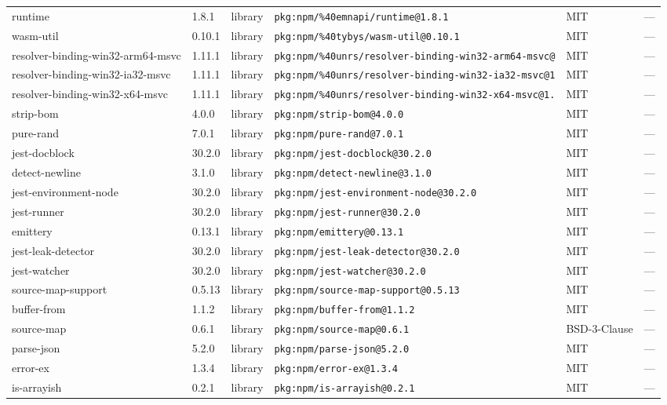 \documentclass[11pt]{article}
\begin{document}
\begin{longtable}{|l|l|l|p{2.2cm}|l|p{4cm}|}
runtime & 1.8.1 & library & \texttt{pkg:npm/\%40emnapi/runtime@1.8.1} & MIT & — \\
wasm-util & 0.10.1 & library & \texttt{pkg:npm/\%40tybys/wasm-util@0.10.1} & MIT & — \\
resolver-binding-win32-arm64-msvc & 1.11.1 & library & \texttt{pkg:npm/\%40unrs/resolver-binding-win32-arm64-msvc@} & MIT & — \\
resolver-binding-win32-ia32-msvc & 1.11.1 & library & \texttt{pkg:npm/\%40unrs/resolver-binding-win32-ia32-msvc@1} & MIT & — \\
resolver-binding-win32-x64-msvc & 1.11.1 & library & \texttt{pkg:npm/\%40unrs/resolver-binding-win32-x64-msvc@1.} & MIT & — \\
strip-bom & 4.0.0 & library & \texttt{pkg:npm/strip-bom@4.0.0} & MIT & — \\
pure-rand & 7.0.1 & library & \texttt{pkg:npm/pure-rand@7.0.1} & MIT & — \\
jest-docblock & 30.2.0 & library & \texttt{pkg:npm/jest-docblock@30.2.0} & MIT & — \\
detect-newline & 3.1.0 & library & \texttt{pkg:npm/detect-newline@3.1.0} & MIT & — \\
jest-environment-node & 30.2.0 & library & \texttt{pkg:npm/jest-environment-node@30.2.0} & MIT & — \\
jest-runner & 30.2.0 & library & \texttt{pkg:npm/jest-runner@30.2.0} & MIT & — \\
emittery & 0.13.1 & library & \texttt{pkg:npm/emittery@0.13.1} & MIT & — \\
jest-leak-detector & 30.2.0 & library & \texttt{pkg:npm/jest-leak-detector@30.2.0} & MIT & — \\
jest-watcher & 30.2.0 & library & \texttt{pkg:npm/jest-watcher@30.2.0} & MIT & — \\
source-map-support & 0.5.13 & library & \texttt{pkg:npm/source-map-support@0.5.13} & MIT & — \\
buffer-from & 1.1.2 & library & \texttt{pkg:npm/buffer-from@1.1.2} & MIT & — \\
source-map & 0.6.1 & library & \texttt{pkg:npm/source-map@0.6.1} & BSD-3-Clause & — \\
parse-json & 5.2.0 & library & \texttt{pkg:npm/parse-json@5.2.0} & MIT & — \\
error-ex & 1.3.4 & library & \texttt{pkg:npm/error-ex@1.3.4} & MIT & — \\
is-arrayish & 0.2.1 & library & \texttt{pkg:npm/is-arrayish@0.2.1} & MIT & — \\

\end{longtable}
\end{document}
